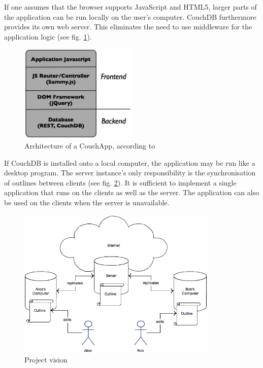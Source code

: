 If one assumes that the browser supports JavaScript and HTML5, larger parts of the application can be run locally on the user's computer. CouchDB furthermore provides its own web server. This eliminates the need to use middleware for the application logic (see fig. \ref{fig:new-web-arch}).

\medskip
\begin{figure}[ht] 
  \begin{center}
    \includegraphics[width=0.5\textwidth]{grafik/new-application-architecture} 
  \end{center}
\caption{Architecture of a CouchApp, according to \cite{web:architecture}}
\label{fig:new-web-arch} 
\end{figure}

\afterpage{\clearpage}

If CouchDB is installed onto a local computer, the application may be run like a desktop program. The server instance's only responsibility is the synchronisation of outlines between clients (see fig. \ref{fig:projektvision}). It is sufficient to implement a single application that runs on the clients as well as the server. The application can also be used on the clients when the server is unavailable.

\medskip
\begin{figure}[H] 
  \begin{center}
    \includegraphics[width=0.85\textwidth]{grafik/Projektvision} 
  \end{center}
  \caption{Project vision}
  \label{fig:projektvision} 
\end{figure}


